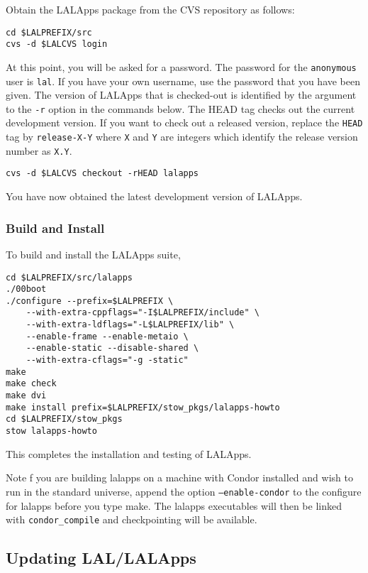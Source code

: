 Obtain the LALApps package from the CVS repository as follows:  
\begin{verbatim}
cd $LALPREFIX/src
cvs -d $LALCVS login
\end{verbatim}
At this point,  you will be asked for a password.  The password for the
\verb+anonymous+ user is \verb+lal+. If you have your own username, use the
password that you have been given.
The version of LALApps that is checked-out is identified by the argument
to the \texttt{-r} option in the commands below.   The HEAD tag checks out the
current development version.  If you want to check out a released
version, replace the \verb+HEAD+ tag by \verb+release-X-Y+ where
\verb+X+ and \verb+Y+ are integers which identify the release version
number as \verb+X.Y+.
\begin{verbatim}
cvs -d $LALCVS checkout -rHEAD lalapps
\end{verbatim}
You have now obtained the latest development version of LALApps.

\subsubsection{Build and Install}
To build and install the LALApps suite, 
\begin{verbatim}
cd $LALPREFIX/src/lalapps
./00boot
./configure --prefix=$LALPREFIX \
    --with-extra-cppflags="-I$LALPREFIX/include" \
    --with-extra-ldflags="-L$LALPREFIX/lib" \
    --enable-frame --enable-metaio \
    --enable-static --disable-shared \
    --with-extra-cflags="-g -static"
make
make check
make dvi
make install prefix=$LALPREFIX/stow_pkgs/lalapps-howto
cd $LALPREFIX/stow_pkgs
stow lalapps-howto
\end{verbatim}
This completes the installation and testing of LALApps.  

Note f you are building lalapps on a machine with Condor installed and wish to
run in the standard universe, append the option \texttt{--enable-condor} to
the configure for lalapps before you type make. The lalapps executables will
then be linked with \texttt{condor\_compile} and checkpointing will be
available.

\color{black}
\subsection{Updating LAL/LALApps}
\color{black}

